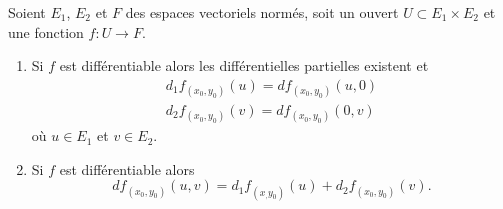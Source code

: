\begin{proposition} \label{PropLDN_nHWDF}
	Soient \( E_1\), \( E_2\) et \( F\) des espaces vectoriels normés, soit un ouvert \( U\subset E_1\times E_2\) et une fonction \( f\colon U\to F\).
	\begin{enumerate}
		\item   \label{ItemRDD_oPmXVi}
		      Si \( f\) est différentiable alors les différentielles partielles existent et
		      \begin{subequations}
			      \begin{align}
				      d_1f_{(x_0,y_0)}(u)=df_{(x_0,y_0)}(u,0) \\
				      d_2f_{(x_0,y_0)}(v)=df_{(x_0,y_0)}(0,v)
			      \end{align}
		      \end{subequations}
		      où \( u\in E_1\) et \( v\in E_2\).
		\item
		      Si \( f\) est différentiable alors
		      \begin{equation}
			      df_{(x_0,y_0)}(u,v)=d_1f_{(x_,y_0)}(u)+d_2f_{(x_0,y_0)}(v).
		      \end{equation}
	\end{enumerate}
\end{proposition}

